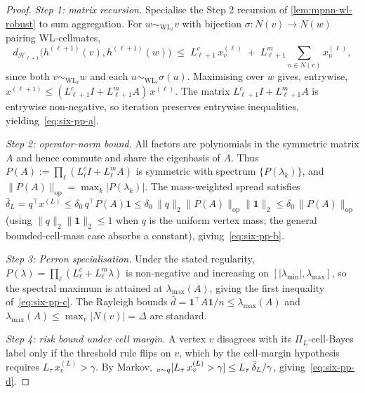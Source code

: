 \documentclass[10pt]{article}
\theoremstyle{definition}
\theoremstyle{remark}
\let\Pr\relax
\DeclareMathOperator{\Pr}{\mathbb{P}}
\begin{document}
\begin{proof}
\emph{Step 1: matrix recursion.} Specialise the Step 2 recursion
of \cref{lem:mpnn-wl-robust} to sum aggregation. For $w
\sim_{\mathrm{WL}_{\ell}} v$ with bijection $\sigma : N(v) \to
N(w)$ pairing WL-cellmates,
\[
  d_{\mathcal{H}_{\ell+1}}\bigl(h^{(\ell+1)}(v), h^{(\ell+1)}(w)\bigr)
  \;\le\; L^{c}_{\ell+1}\, x^{(\ell)}_{v}
    \;+\; L^{m}_{\ell+1} \sum_{u \in N(v)} x^{(\ell)}_{u},
\]
since both $v \sim_{\mathrm{WL}_{\ell}} w$ and each
$u \sim_{\mathrm{WL}_{\ell}} \sigma(u)$. Maximising over $w$
gives, entrywise,
$
  x^{(\ell+1)} \le (L^{c}_{\ell+1} I + L^{m}_{\ell+1} A)\, x^{(\ell)}.
$
The matrix $L^{c}_{\ell+1} I + L^{m}_{\ell+1} A$ is entrywise
non-negative, so iteration preserves entrywise inequalities,
yielding~\eqref{eq:six-pp-a}.

\emph{Step 2: operator-norm bound.} All factors are polynomials
in the symmetric matrix $A$ and hence commute and share the
eigenbasis of $A$. Thus
$P(A) := \prod_{\ell}(L^{c}_{\ell} I + L^{m}_{\ell} A)$ is
symmetric with spectrum $\{P(\lambda_{k})\}$, and
$\| P(A) \|_{\mathrm{op}} = \max_{k} |P(\lambda_{k})|$. The
mass-weighted spread satisfies
$\bar{\delta}_{L} = q^{\top} x^{(L)} \le \delta_{0}\, q^{\top} P(A) \mathbf{1}
\le \delta_{0}\, \| q \|_{2} \| P(A) \|_{\mathrm{op}} \| \mathbf{1} \|_{2}
\le \delta_{0}\, \| P(A) \|_{\mathrm{op}}$
(using $\| q \|_{2} \| \mathbf{1} \|_{2} \le 1$ when $q$ is the
uniform vertex mass; the general bounded-cell-mass case absorbs
a constant), giving~\eqref{eq:six-pp-b}.

\emph{Step 3: Perron specialisation.} Under the stated
regularity, $P(\lambda) = \prod_{\ell}(L^{c}_{\ell} + L^{m}_{\ell} \lambda)$
is non-negative and increasing on
$[|\lambda_{\min}|, \lambda_{\max}]$, so the spectral maximum is
attained at $\lambda_{\max}(A)$, giving the first inequality
of~\eqref{eq:six-pp-c}. The Rayleigh bounds
$\bar{d} = \mathbf{1}^{\top} A \mathbf{1}/n \le \lambda_{\max}(A)$
and $\lambda_{\max}(A) \le \max_{v} |N(v)| = \Delta$ are
standard.

\emph{Step 4: risk bound under cell margin.} A vertex $v$
disagrees with its $\Pi_{L}$-cell-Bayes label only if the
threshold rule flips on $v$, which by the cell-margin hypothesis
requires $L_{\tau}\, x^{(L)}_{v} > \gamma$. By Markov,
$\Pr_{v \sim q}[L_{\tau}\, x^{(L)}_{v} > \gamma] \le
L_{\tau}\, \bar{\delta}_{L} / \gamma$, giving~\eqref{eq:six-pp-d}.
\end{proof}
\end{document}
